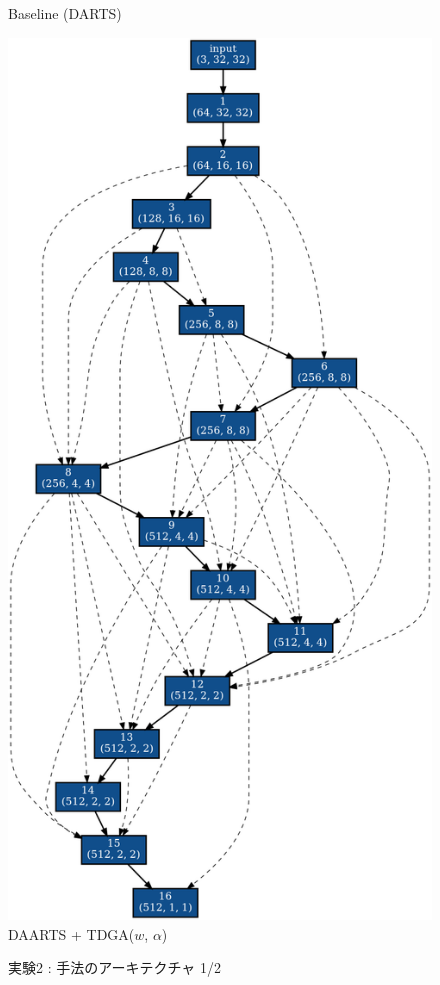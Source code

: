 \begin{figure}[tb]
\begin{minipage}{0.5\hsize}
\begin{center}
    Baseline (DARTS)
 	\end{center}
 \end{minipage}
 \begin{minipage}{0.5\hsize}
 	\begin{center}
    \includegraphics[clip,scale=0.2]{./fig/04.exp/nofix_last.png}\\
    DAARTS + TDGA($w$, $\alpha$)
 	\end{center}
 \end{minipage}
 \caption{実験2 : 手法のアーキテクチャ 1/2}
 \label{fig:exp2/archi}
\end{figure}

